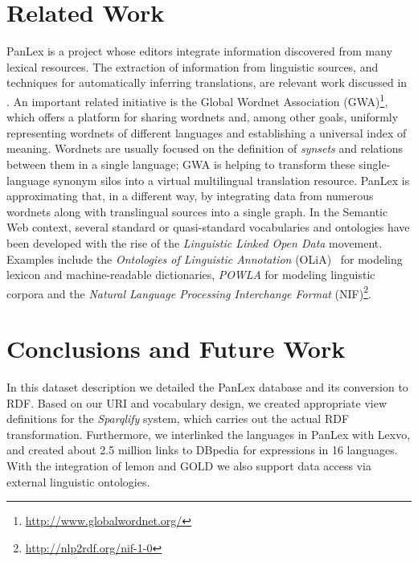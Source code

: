 \documentclass[sw]{iosart2c}
\begin{document}
\section{Related Work}
\label{sec:related}
PanLex is a project whose editors integrate information discovered from many lexical resources.
The extraction of information from linguistic sources, and techniques for automatically inferring translations,
are relevant work discussed in \cite{panlex_probtrans}.
An important related initiative is the Global Wordnet Association (GWA)\footnote{\url{http://www.globalwordnet.org/}\vspace{0.7em}},
which offers a platform for sharing wordnets and, among other goals, uniformly representing wordnets
of different languages and establishing a universal index of meaning.
Wordnets are usually focused on the
definition of \emph{synsets} and relations between them in a single language; GWA is helping to transform these single-language synonym silos into a virtual multilingual translation resource. PanLex is approximating that, in a different way, by integrating data from numerous wordnets along with translingual sources into a single graph.
In the Semantic Web context, several standard or quasi-standard vocabularies and ontologies have been developed with the rise of the \emph{Linguistic Linked Open Data} movement.
Examples include the
\emph{Ontologies of Linguistic Annotation} (OLiA)~\cite{olia2010} for modeling
lexicon and machine-readable dictionaries, \emph{POWLA} for modeling linguistic corpora\cite{powla2012} and the \emph{Natural Language Processing Interchange Format} (NIF)\footnote{\url{http://nlp2rdf.org/nif-1-0}}.

\section{Conclusions and Future Work}
\label{sec:conclusion}
In this dataset description we detailed the PanLex database and its conversion to RDF.
Based on our URI and vocabulary design, we created appropriate view definitions
for the \emph{Sparqlify} system, which carries out the actual RDF
transformation.
Furthermore, we interlinked the languages in PanLex with Lexvo, and created about 2.5 million links to DBpedia for expressions in 16 languages.
With the integration of lemon and GOLD we also support data access via external linguistic ontologies.
\end{document}
